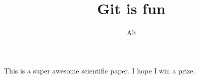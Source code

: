 \documentclass[10pt]{article}
\author{Ali}
\title{Git is fun}
\begin{document}
	\maketitle
	
	This is a super awesome scientific paper.
	I hope I win a prize.
\end{document}
